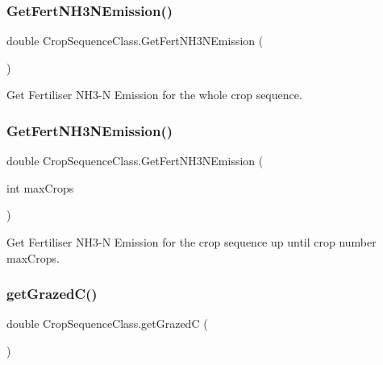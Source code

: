 \subsubsection{\texorpdfstring{GetFertNH3NEmission()}{GetFertNH3NEmission()}\hspace{0.1cm}{\footnotesize\ttfamily [1/2]}}
{\footnotesize\ttfamily double Crop\+Sequence\+Class.\+Get\+Fert\+N\+H3\+N\+Emission (\begin{DoxyParamCaption}{ }\end{DoxyParamCaption})\hspace{0.3cm}{\ttfamily [inline]}}



Get Fertiliser N\+H3-\/N Emission for the whole crop sequence. 

\mbox{\label{class_crop_sequence_class_af4c2ab1312cb344e0a1e94b3bca0e8e4}} 
\subsubsection{\texorpdfstring{GetFertNH3NEmission()}{GetFertNH3NEmission()}\hspace{0.1cm}{\footnotesize\ttfamily [2/2]}}
{\footnotesize\ttfamily double Crop\+Sequence\+Class.\+Get\+Fert\+N\+H3\+N\+Emission (\begin{DoxyParamCaption}\item[{int}]{max\+Crops }\end{DoxyParamCaption})\hspace{0.3cm}{\ttfamily [inline]}}



Get Fertiliser N\+H3-\/N Emission for the crop sequence up until crop number max\+Crops. 

\mbox{\label{class_crop_sequence_class_aa8f5a123e42333f86e3282c134298864}} 
\subsubsection{\texorpdfstring{getGrazedC()}{getGrazedC()}}
{\footnotesize\ttfamily double Crop\+Sequence\+Class.\+get\+GrazedC (\begin{DoxyParamCaption}{ }\end{DoxyParamCaption})\hspace{0.3cm}{\ttfamily [inline]}}



